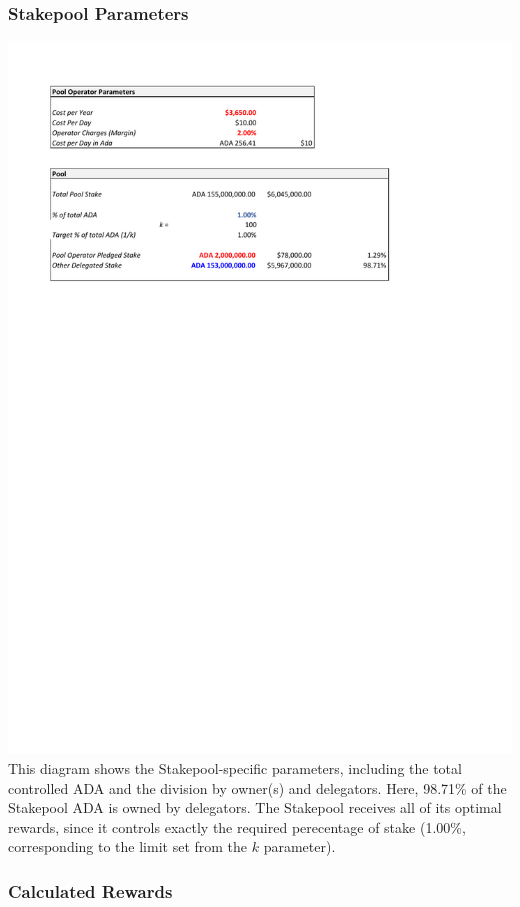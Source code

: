 \documentclass[11pt,a4paper,dvipsnames,twosided,final]{article}
\newcommand{\ada}{ADA{}}
\begin{document}
\subsubsection*{Stakepool Parameters}
\includegraphics[width=\textwidth]{RC2.pdf}
\noindent
This diagram shows the Stakepool-specific parameters, including the total controlled \ada{} and the
division by owner(s) and delegators.  Here, 98.71\% of the Stakepool \ada{} is owned
by delegators.  The Stakepool receives all of its optimal rewards, since it controls
exactly the required perecentage of stake (1.00\%, corresponding to the limit set from
the $k$ parameter).

\subsubsection*{Calculated Rewards}
\end{document}
